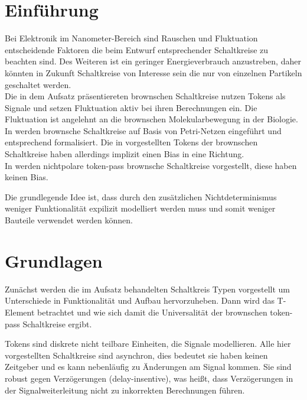 \documentclass[11pt,a4paper]{article}
\begin{document}
\clearpage

\section{Einführung}
Bei Elektronik im Nanometer-Bereich sind Rauschen und Fluktuation 
entscheidende Faktoren die beim Entwurf entsprechender Schaltkreise 
zu beachten sind.
%
Des Weiteren ist ein geringer Energieverbrauch anzustreben, daher 
könnten in Zukunft Schaltkreise von Interesse sein die nur von einzelnen 
Partikeln geschaltet werden. \\
%
Die in dem Aufsatz \cite{Peper_nonPolar_2018} präsentiereten brownschen
Schaltkreise nutzen Tokens als Signale und setzen
Fluktuation aktiv bei ihren Berechnungen ein.
%
Die Fluktuation ist angelehnt an die brownschen Molekularbewegung 
in der Biologie. \\
%
In \cite{Peper_Fundamentals_2013} werden brownsche Schaltkreise 
auf Basis von Petri-Netzen eingeführt und entsprechend formalisiert.
%
Die in \cite{Peper_Fundamentals_2013} vorgestellten Tokens der brownschen
Schaltkreise haben allerdings implizit einen Bias in eine Richtung. \\ 
%
In \cite{Peper_nonPolar_2018} werden nichtpolare token-pass
brownsche Schaltkreise vorgestellt, diese haben keinen Bias.

Die grundlegende Idee ist, dass durch den zusätzlichen Nichtdeterminismus 
weniger Funktionalität expilizit modelliert werden muss 
und somit weniger Bauteile verwendet werden können.



\section{Grundlagen}
Zunächst werden die im Aufsatz behandelten Schaltkreis Typen vorgestellt 
um Unterschiede in Funktionalität und Aufbau hervorzuheben.  
%
Dann wird das T-Element betrachtet und wie sich damit die Universalität der
brownschen token-pass Schaltkreise ergibt. 

\smallskip Tokens sind diskrete nicht teilbare Einheiten, die Signale modellieren.
%
Alle hier vorgestellten Schaltkreise sind asynchron, dies bedeutet sie haben
keinen Zeitgeber und es kann nebenläufig zu Änderungen am Signal kommen.
%
Sie sind robust gegen Verzögerungen (delay-insentive),
was heißt, dass Verzögerungen in der Signalweiterleitung 
nicht zu inkorrekten Berechnungen führen.
\end{document}
